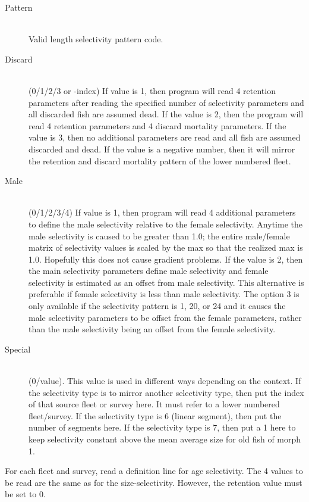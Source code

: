 \begin{description}
	\item[Pattern]\hfill\\
	Valid length selectivity pattern code.

	\item[Discard]\hfill\\
	(0/1/2/3 or -index)  If value is 1, then program will read 4 retention parameters after reading the specified number of selectivity parameters and all discarded fish are assumed dead.  If the value is 2, then the program will read 4 retention parameters and 4 discard mortality parameters.  If the value is 3, then no additional parameters are read and all fish are assumed discarded and dead. If the value is a negative number, then it will mirror the retention and discard mortality pattern of the lower numbered fleet.

	\item[Male]\hfill\\
	(0/1/2/3/4)  If value is 1, then program will read 4 additional parameters to define the male selectivity relative to the female selectivity.  Anytime the male selectivity is caused to be greater than 1.0; the entire male/female matrix of selectivity values is scaled by the max so that the realized max is 1.0.  Hopefully this does not cause gradient problems.  If the value is 2, then the main selectivity parameters define male selectivity and female selectivity is estimated as an offset from male selectivity.  This alternative is preferable if female selectivity is less than male selectivity.  The option 3 is only available if the selectivity pattern is 1, 20, or 24 and it causes the male selectivity parameters to be offset from the female parameters, rather than the male selectivity being an offset from the female selectivity.

	\item[Special]\hfill\\
	(0/value).  This value is used in different ways depending on the context.  If the selectivity type is to mirror another selectivity type, then put the index of that source fleet or survey here.  It must refer to a lower numbered fleet/survey.  If the selectivity type is 6 (linear segment), then put the number of segments here.  If the selectivity type is 7, then put a 1 here to keep selectivity constant above the mean average size for old fish of morph 1.
\end{description}

For each fleet and survey, read a definition line for age selectivity.  The 4 values to be read are the same as for the size-selectivity.  However, the retention value must be set to 0.

